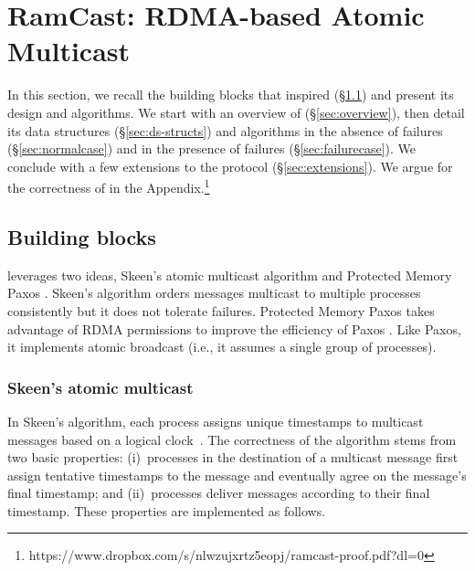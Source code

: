 
\section{RamCast: RDMA-based Atomic Multicast}
\label{sec:rdma-atomic-multicast}

In this section, we recall the building blocks that inspired \libname (\S\ref{sec:bblocks}) and present its design and algorithms. 
We start with an overview of \libname (\S\ref{sec:overview}), then detail its data structures (\S\ref{sec:ds-structs}) and algorithms in the absence of failures (\S\ref{sec:normalcase}) and in the presence of failures (\S\ref{sec:failurecase}).
We conclude with a few extensions to the protocol (\S\ref{sec:extensions}).
We argue for the correctness of \libname in the Appendix.\footnote{https://www.dropbox.com/s/nlwzujxrtz5eopj/ramcast-proof.pdf?dl=0}

\subsection{Building blocks}
\label{sec:bblocks}

\libname leverages two ideas, Skeen's atomic multicast algorithm \cite{BJ87b} and Protected Memory Paxos \cite{Aguilera2019}.
Skeen's algorithm orders messages multicast to multiple processes consistently but it does not tolerate failures.
Protected Memory Paxos takes advantage of RDMA permissions to improve the efficiency of Paxos \cite{L98}. 
Like Paxos, it implements atomic broadcast (i.e., it assumes a single group of processes).


\subsubsection{Skeen's atomic multicast}

In Skeen's algorithm, each process assigns unique timestamps to multicast messages based on a logical clock~\cite{Lam78}.
The correctness of the algorithm stems from two basic properties:
(i)~processes in the destination of a multicast message first assign tentative timestamps to the message and eventually agree on the message's final timestamp; and
(ii)~processes deliver messages according to their final timestamp.
These properties are implemented as follows.

